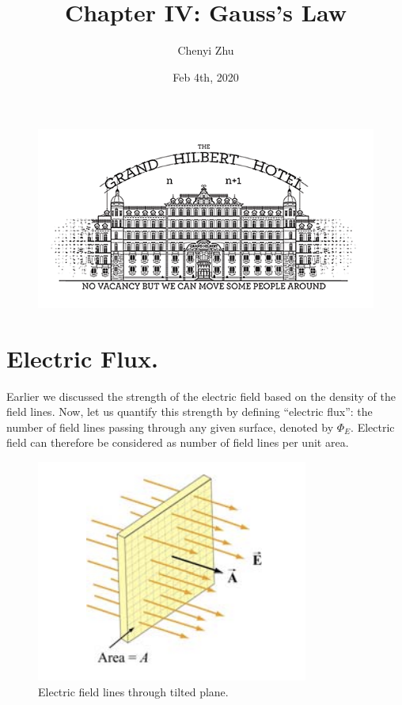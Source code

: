 \documentclass[11pt, letterpaper]{article}
\title{Chapter IV: Gauss's Law}
\author{Chenyi Zhu}
\date{Feb 4th, 2020}
\begin{document}
\begin{titlingpage}
	\maketitle
	
	\begin{figure}[h!]
		\centering
		\includegraphics[scale=0.6]{cover}
		\label{fig:flux}
	\end{figure}
		
\end{titlingpage}
	
	\section{Electric Flux.}
	Earlier we discussed the strength of the electric field based on the density of the field lines.
	Now, let us quantify this strength by defining ``electric flux'': the number of field lines passing 
	through any given surface, denoted by $\Phi_E$. Electric field can therefore be considered as
	number of field lines per unit area.
	\begin{figure}[h!]
		\centering
		\includegraphics[scale=0.8]{flux}
		\caption{Electric field lines through tilted plane.}
	\end{figure}
	
\end{document}
